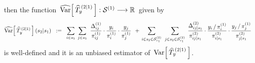 \begin{theorem}
\begin{enumerate}
	then the function
	\,$\widehat{\textnormal{Var}}\!\left[\,\widehat{T}^{\,(2 \vert 1)}_{y}\,\right] : \mathcal{S}^{(1)} \longrightarrow \mathbb{R}$\,
	given by
	\begin{equation*}
	\widehat{\textnormal{Var}}\!\left[\,\widehat{T}^{\,(2 \vert 1)}_{y}\,\right](s_{2} \vert s_{1})
	\;\; := \;\;
		\underset{i \in s_{1}}{\sum}\;\,
		\underset{j \in s_{1}}{\sum}\;\;
			\dfrac{ \Delta^{(1)}_{ij} }{ \pi^{(1)}_{ij} }
			\cdot
			\dfrac{y_{i}}{\pi^{(1)}_{i}}
			\cdot
			\dfrac{y_{j}}{\pi^{(1)}_{j}}
		\;\, + \,
		\underset{i \in s_{2} \in \mathcal{S}^{(2)}_{s_{1}} }{\sum}\;\;
		\underset{j \in s_{2} \in \mathcal{S}^{(2)}_{s_{1}} }{\sum}\;\,
			\dfrac{ \Delta^{(2)}_{ij \vert s_{1}} }{ \pi^{(2)}_{ij \vert s_{1}} }
			\cdot
			\dfrac{ y_{i} \,/\, \pi^{(1)}_{i} }{ \pi^{(2)}_{i \vert s_{1}} }
			\cdot
			\dfrac{ y_{j} \,/\, \pi^{(1)}_{j} }{ \pi^{(2)}_{j \vert s_{1}} }
	\end{equation*}
	is well-defined and it is an unbiased estimator of \,$\textnormal{Var}\!\left[\,\widehat{T}^{\,(2 \vert 1)}_{y}\,\right]$.
\end{enumerate}
\end{theorem}
\proof
